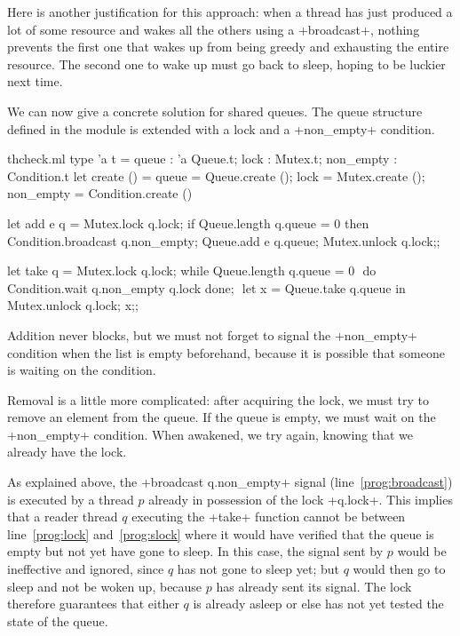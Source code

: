 Here is another justification for this approach: when a thread has
just produced a lot of some resource and wakes all the others using a
\ml+broadcast+, nothing prevents the first one that wakes up from
being greedy and exhausting the entire resource.  The second one to
wake up must go back to sleep, hoping to be luckier next time.

We can now give a concrete solution for shared queues.  The queue
structure defined in the  module is extended with a lock and
a \ml+non_empty+ condition.
%
\begin{listingcodefile}[style=numbers]{thcheck.ml}
type 'a t = 
  { queue : 'a Queue.t; lock : Mutex.t; non_empty : Condition.t }
let create () = 
  { queue = Queue.create (); 
    lock = Mutex.create (); non_empty = Condition.create () }

let add e q = 
  Mutex.lock q.lock; 
  if Queue.length q.queue = 0 then Condition.broadcast q.non_empty;$\label{prog:broadcast}$
  Queue.add e q.queue; 
  Mutex.unlock q.lock;;

let take q = 
  Mutex.lock q.lock; 
  while Queue.length q.queue = 0 $\label{prog:lock}$
  do Condition.wait q.non_empty q.lock done;  $\label{prog:slock}$
  let x = Queue.take q.queue in
  Mutex.unlock q.lock; x;;
\end{listingcodefile}
%
Addition never blocks, but we must not forget to signal
the \ml+non_empty+ condition when the list is empty beforehand,
because it is possible that someone is waiting on the condition.

Removal is a little more complicated: after acquiring the lock, we
must try to remove an element from the queue. If the queue is empty,
we must wait on the \ml+non_empty+ condition.  When awakened, we try
again, knowing that we already have the lock.

As explained above, the \ml+broadcast q.non_empty+ signal
(line~\ref{prog:broadcast}) is executed by a thread $p$ already in
possession of the lock \ml+q.lock+.
This implies that a reader thread $q$ executing the \ml+take+ function
cannot be between line~\ref{prog:lock} and~\ref{prog:slock}
where it would have verified that the queue is empty but not yet have
gone to sleep.  In this case, the signal sent by $p$ would be
ineffective and ignored, since $q$ has not gone to sleep yet; but $q$
would then go to sleep and not be woken up, because $p$ has already
sent its signal.
The lock therefore guarantees that either $q$ is already asleep or
else has not yet tested the state of the queue.

